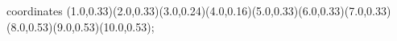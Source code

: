 					coordinates { (1.0,0.33)(2.0,0.33)(3.0,0.24)(4.0,0.16)(5.0,0.33)(6.0,0.33)(7.0,0.33)(8.0,0.53)(9.0,0.53)(10.0,0.53)};